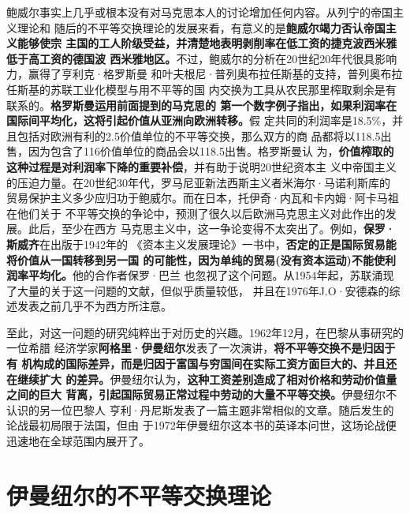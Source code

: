 鲍威尔事实上几乎或根本没有对马克思本人的讨论增加任何内容。从列宁的帝国主义理论和
随后的不平等交换理论的发展来看，有意义的是\textbf{鲍威尔竭力否认帝国主义能够使宗
  主国的工人阶级受益，并清楚地表明剥削率在低工资的捷克波西米雅低于高工资的德国波
  西米雅地区。}不过，鲍威尔的分析在20世纪20年代很具影响力，赢得了亨利克·格罗斯曼
和叶夫根尼·普列奥布拉任斯基的支持，普列奥布拉任斯基的苏联工业化模型与用不平等的国
内交换为工具从农民那里榨取剩余是有联系的。\textbf{格罗斯曼运用前面提到的马克思的
  第一个数字例子指出，如果利润率在国际间平均化，这将引起价值从亚洲向欧洲转移。}假
定共同的利润率是18.5\%，并且包括对欧洲有利的2.5价值单位的不平等交换，那么双方的商
品都将以118.5出售，因为包含了116价值单位的商品会以118.5出售。格罗斯曼认
为，\textbf{价值榨取的这种过程是对利润率下降的重要补偿}，并有助于说明20世纪资本主
义中帝国主义的压迫力量。在20世纪30年代，罗马尼亚新法西斯主义者米海尔·马诺利斯库的
贸易保护主义多少应归功于鲍威尔。而在日本，托伊奇·内瓦和卡内姆·阿卡马祖在他们关于
不平等交换的争论中，预测了很久以后欧洲马克思主义对此作出的发展。此后，至少在西方
马克思主义中，这一争论变得不太突出了。例如，\textbf{保罗·斯威齐}在出版于1942年的
《资本主义发展理论》一书中，\textbf{否定的正是国际贸易能将价值从一国转移到另一国
  的可能性，因为单纯的贸易(没有资本运动)不能使利润率平均化。}他的合作者保罗·巴兰
也忽视了这个问题。从1954年起，苏联涌现了大量的关于这一问题的文献，但似乎质量较低，
并且在1976年J.O·安德森的综述发表之前几乎不为西方所注意。

至此，对这一问题的研究纯粹出于对历史的兴趣。1962年12月，在巴黎从事研究的一位希腊
经济学家\textbf{阿格里·伊曼纽尔}发表了一次演讲，\textbf{将不平等交换不是归因于有
  机构成的国际差异，而是归因于富国与穷国间在实际工资方面巨大的、并且还在继续扩大
  的差异。}伊曼纽尔认为，\textbf{这种工资差别造成了相对价格和劳动价值量之间的巨大
  背离，引起国际贸易正常过程中劳动的大量不平等交换。}伊曼纽尔不认识的另一位巴黎人
亨利·丹尼斯发表了一篇主题非常相似的文章。随后发生的论战最初局限于法国，但由
于1972年伊曼纽尔这本书的英译本问世，这场论战便迅速地在全球范围内展开了。

\section{伊曼纽尔的不平等交换理论}

